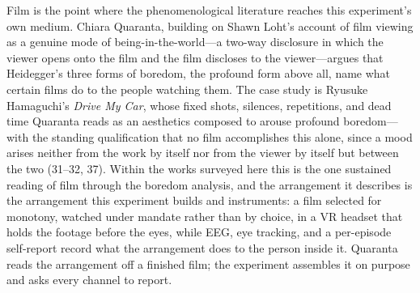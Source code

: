 Film is the point where the phenomenological literature reaches this experiment's own medium.
Chiara Quaranta, building on Shawn Loht's account of film viewing as a genuine mode of
being-in-the-world---a two-way disclosure in which the viewer opens onto the film and the
film discloses to the viewer---argues that Heidegger's three forms of boredom, the profound
form above all, name what certain films do to the people watching them. The case study is
Ryusuke Hamaguchi's \textit{Drive My Car}, whose fixed shots, silences, repetitions, and dead
time Quaranta reads as an aesthetics composed to arouse profound boredom---with the standing
qualification that no film accomplishes this alone, since a mood arises neither from the work
by itself nor from the viewer by itself but between the two (31--32, 37). Within the works
surveyed here this is the one sustained reading of film through the boredom analysis, and the
arrangement it describes is the arrangement this experiment builds and instruments: a film
selected for monotony, watched under mandate rather than by choice, in a VR headset that
holds the footage before the eyes, while EEG, eye tracking, and a per-episode self-report
record what the arrangement does to the person inside it. Quaranta reads the arrangement off
a finished film; the experiment assembles it on purpose and asks every channel to report.

